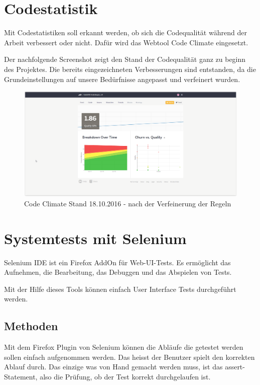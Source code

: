 \section{Codestatistik}
Mit Codestatistiken soll erkannt werden, ob sich die Codequalität während der Arbeit verbessert oder nicht. Dafür wird das Webtool Code Climate eingesetzt.

Der nachfolgende Screenshot zeigt den Stand der Codequalität ganz zu beginn des Projektes. Die bereits eingezeichneten Verbesserungen sind entstanden, da die Grundeinstellungen auf unsere Bedürfnisse angepasst und verfeinert wurden.

\begin{figure}[H]
	\centering
	\includegraphics[width=1\textwidth
	]{Images/Stand_Beginn_181016.PNG}
	\caption{Code Climate Stand 18.10.2016 - nach der Verfeinerung der Regeln}
\end{figure}



\section{Systemtests mit Selenium}
Selenium IDE ist ein Firefox AddOn für Web-\acrfull{UI}-Tests. Es ermöglicht das Aufnehmen, die Bearbeitung, das Debuggen und das Abspielen von Tests. 

Mit der Hilfe dieses Tools können einfach \gls{User Interface} Tests durchgeführt werden.

\subsection{Methoden}
Mit dem Firefox Plugin von Selenium können die Abläufe die getestet werden sollen einfach aufgenommen werden. Das heisst der Benutzer spielt den korrekten Ablauf durch. Das einzige was von Hand gemacht werden muss, ist das assert-Statement, also die Prüfung, ob der Test korrekt durchgelaufen ist.

